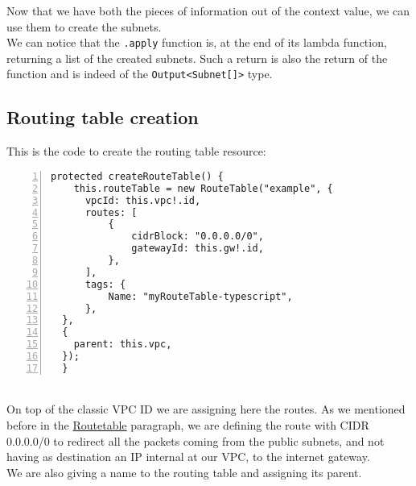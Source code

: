 Now that we have both the pieces of information out of the context value, we can use them to create the subnets.\\
We can notice that the \texttt{.apply} function is, at the end of its lambda function, returning a list of the created subnets.
Such a return is also the return of the function and is indeed of the \texttt{Output<Subnet[]>} type.

\subsection{Routing table creation}
This is the code to create the routing table resource:
\begin{lstlisting}[numbers=left, numberstyle=\tiny, numbersep=-5pt, stepnumber=1]
  protected createRouteTable() {
    this.routeTable = new RouteTable("example", {
      vpcId: this.vpc!.id,
      routes: [
          {
              cidrBlock: "0.0.0.0/0",
              gatewayId: this.gw!.id,
          },
      ],
      tags: {
          Name: "myRouteTable-typescript",
      },
  },
  {
    parent: this.vpc,
  });
  }
\end{lstlisting}\mbox{}\\
On top of the classic VPC ID we are assigning here the routes.
As we mentioned before in the \hyperref[sssec:routetable]{Routetable} paragraph, we are defining the route with CIDR 0.0.0.0/0 to redirect all the packets coming from the public subnets, and not having as destination an IP internal at our VPC, to the internet gateway.\\
We are also giving a name to the routing table and assigning its parent.


